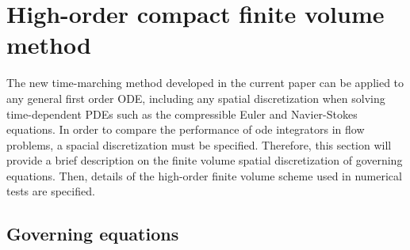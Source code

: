 \section{High-order compact finite volume method}
\label{sec:CFV}

The new time-marching method developed in
the current paper can be applied to any general first order 
ODE, including any spatial discretization when solving
time-dependent PDEs such as the compressible Euler and Navier-Stokes
equations.
In order to compare the performance of ode integrators in flow problems,
a spacial discretization must be specified.
Therefore,
this section will provide a brief description on the
finite volume spatial discretization of governing equations.
Then, details
of the high-order finite volume scheme
used in numerical tests are specified.

\subsection{Governing equations}
\label{ssec:GovEq}

